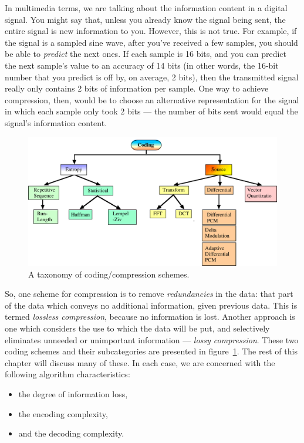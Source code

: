 \begin{window}
In multimedia terms, we are talking about the information content in a
digital signal. You might say that, unless you already know the signal
being sent, the entire signal is new information to you.  However,
this is not true. For example, if the signal is a sampled sine wave,
after you've received a few samples, you should be able to
\emph{predict} the next ones. If each sample is 16 bits, and you can
predict the next sample's value to an accuracy of 14 bits (in other
words, the 16-bit number that you predict is off by, on average, 2
bits), then the transmitted signal really only contains 2 bits of
information per sample. One way to achieve compression, then, would be
to choose an alternative representation for the signal in which each
sample only took 2 bits --- the number of bits sent would equal the
signal's information content.
\end{window}

\begin{figure}
\centerline{\includegraphics[width=\textwidth]{ch-comp/taxonomy}}
\caption{A taxonomy of coding/compression schemes.\label{fg:taxonomy}}
\end{figure}

So, one scheme for compression is to remove \emph{redundancies} in the
data: that part of the data which conveys no additional information,
given previous data. This is termed \emph{lossless compression},
because no information is lost.  Another approach is one which
considers the use to which the data will be put, and selectively
eliminates unneeded or unimportant information --- \emph{lossy
compression}. These two coding schemes and their subcategories are
presented in figure~\ref{fg:taxonomy}.  The rest of this chapter will
discuss many of these. In each case, we are concerned with the
following algorithm characteristics:
\begin{itemize}
\item the degree of information loss,
\item the encoding complexity,
\item and the decoding complexity.
\end{itemize}

